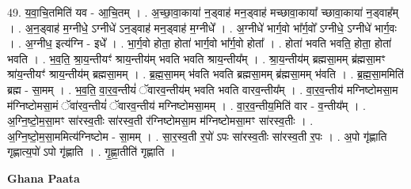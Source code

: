 \documentclass[17pt]{extarticle}
\begin{document}
49. य॒वा॒चि॒तमिति॑ यव - आ॒चि॒तम् । . अ॒च्छा॒वा॒काया॑ न॒ड्वाह॑ मन॒ड्वाह॑ मच्छावा॒काया᳚ च्छावा॒काया॑ न॒ड्वाह᳚म् । . अ॒न॒ड्वाह॑ म॒ग्नीधे॒ ऽग्नीधे॑ ऽन॒ड्वाह॑ मन॒ड्वाह॑ म॒ग्नीधे᳚ । . अ॒ग्नीधे॑ भार्ग॒वो भा᳚र्ग॒वो᳚ ऽग्नीधे॒ ऽग्नीधे॑ भार्ग॒वः । . अ॒ग्नीध॒ इत्य॑ग्नि - इधे᳚ । . भा॒र्ग॒वो होता॒ होता॑ भार्ग॒वो भा᳚र्ग॒वो होता᳚ । . होता॑ भवति भवति॒ होता॒ होता॑ भवति । . भ॒व॒ति॒ श्रा॒य॒न्तीयꣳ॑ श्राय॒न्तीय॑म् भवति भवति श्राय॒न्तीय᳚म् । . श्रा॒य॒न्तीय॑म् ब्रह्मसा॒मम् ब्र॑ह्मसा॒मꣳ श्रा॑य॒न्तीयꣳ॑ श्राय॒न्तीय॑म् ब्रह्मसा॒मम् । . ब्र॒ह्म॒सा॒मम् भ॑वति भवति ब्रह्मसा॒मम् ब्र॑ह्मसा॒मम् भ॑वति । . ब्र॒ह्म॒सा॒ममिति॑ ब्रह्म - सा॒मम् । . भ॒व॒ति॒ वा॒र॒व॒न्तीयं॑ ॅवारव॒न्तीय॑म् भवति भवति वारव॒न्तीय᳚म् । . वा॒र॒व॒न्तीय॑ मग्निष्टोमसा॒म म॑ग्निष्टोमसा॒मं ॅवा॑रव॒न्तीयं॑ ॅवारव॒न्तीय॑ मग्निष्टोमसा॒मम् । . वा॒र॒व॒न्तीय॒मिति॑ वार - व॒न्तीय᳚म् । . अ॒ग्नि॒ष्टो॒म॒सा॒मꣳ सा॑रस्व॒तीः सा॑रस्व॒ती र॑ग्निष्टोमसा॒म म॑ग्निष्टोमसा॒मꣳ सा॑रस्व॒तीः । . अ॒ग्नि॒ष्टो॒म॒सा॒ममित्य॑ग्निष्टोम - सा॒मम् । . सा॒र॒स्व॒ती र॒पो॑ ऽपः सा॑रस्व॒तीः सा॑रस्व॒ती र॒पः । . अ॒पो गृ॑ह्णाति गृह्णात्य॒पो॑ ऽपो गृ॑ह्णाति । . गृ॒ह्णा॒तीति॑ गृह्णाति । \newline

\textbf{Ghana Paata } \newline
\end{document}
